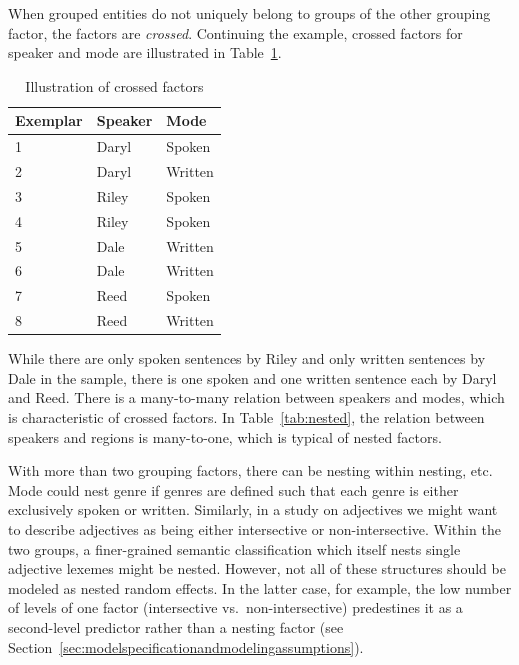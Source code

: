 When grouped entities do not uniquely belong to groups of the other grouping factor, the factors are \textit{crossed}.
Continuing the example, crossed factors for speaker and mode are illustrated in Table~\ref{tab:crossed}.
%
\begin{table}
  \centering
  \begin{tabular}{lll}
    \toprule
    \textbf{Exemplar} & \textbf{Speaker}  & \textbf{Mode}   \\
    \midrule
                    1 &           Daryl  &         Spoken  \\
                    2 &           Daryl  &         Written \\
                    3 &           Riley  &         Spoken  \\
                    4 &           Riley  &         Spoken  \\
                    5 &           Dale   &         Written \\
                    6 &           Dale   &         Written \\
                    7 &           Reed   &         Spoken  \\
                    8 &           Reed   &         Written \\
    \bottomrule
  \end{tabular}
  \caption{Illustration of crossed factors}
  \label{tab:crossed}
\end{table}
%
While there are only spoken sentences by Riley and only written sentences by Dale in the sample, there is one spoken and one written sentence each by Daryl and Reed.
There is a many-to-many relation between speakers and modes, which is characteristic of crossed factors.
In Table~\ref{tab:nested}, the relation between speakers and regions is many-to-one, which is typical of nested factors.

With more than two grouping factors, there can be nesting within nesting, etc.
Mode could nest genre if genres are defined such that each genre is either exclusively spoken or written.
Similarly, in a study on adjectives we might want to describe adjectives as being either intersective or non-intersective.
Within the two groups, a finer-grained semantic classification which itself nests single adjective lexemes might be nested.
However, not all of these structures should be modeled as nested random effects.
In the latter case, for example, the low number of levels of one factor (intersective vs.\ non-intersective) predestines it as a second-level predictor rather than a nesting factor (see Section~\ref{sec:modelspecificationandmodelingassumptions}).

